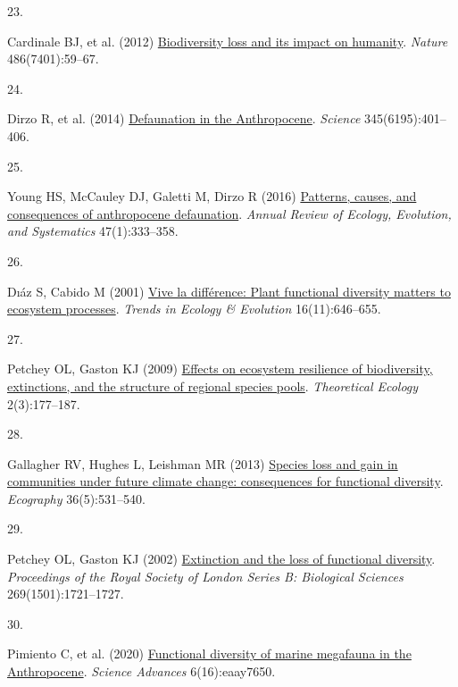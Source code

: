 \documentclass{article}
\newlength{\cslhangindent}
\newlength{\csllabelwidth}
\newlength{\cslentryspacingunit} %
\newenvironment{CSLReferences}[2] %
 {%
  \setlength{\parindent}{0pt}
  \ifodd #1
  \let\oldpar\par
  \def\par{\hangindent=\cslhangindent\oldpar}
  \fi
  \setlength{\parskip}{#2\cslentryspacingunit}
 }%
 {}
\newcommand{\CSLLeftMargin}[1]{\parbox[t]{\csllabelwidth}{#1}}
\newcommand{\CSLRightInline}[1]{\parbox[t]{\linewidth - \csllabelwidth}{#1}\break}
\begin{document}
\begin{CSLReferences}{0}{0}
\leavevmode{}%
\CSLLeftMargin{23. }%
\CSLRightInline{Cardinale BJ, et al. (2012)
\href{https://doi.org/10.1038/nature11148}{Biodiversity loss and its
impact on humanity}. \emph{Nature} 486(7401):59--67.}

\leavevmode{}%
\CSLLeftMargin{24. }%
\CSLRightInline{Dirzo R, et al. (2014)
\href{https://doi.org/10.1126/science.1251817}{Defaunation in the
Anthropocene}. \emph{Science} 345(6195):401--406.}

\leavevmode{}%
\CSLLeftMargin{25. }%
\CSLRightInline{Young HS, McCauley DJ, Galetti M, Dirzo R (2016)
\href{https://doi.org/10.1146/annurev-ecolsys-112414-054142}{Patterns,
causes, and consequences of anthropocene defaunation}. \emph{Annual
Review of Ecology, Evolution, and Systematics} 47(1):333--358.}

\leavevmode{}%
\CSLLeftMargin{26. }%
\CSLRightInline{Dıáz S, Cabido M (2001)
\href{https://doi.org/10.1016/S0169-5347(01)02283-2}{Vive la différence:
Plant functional diversity matters to ecosystem processes}. \emph{Trends
in Ecology \& Evolution} 16(11):646--655.}

\leavevmode{}%
\CSLLeftMargin{27. }%
\CSLRightInline{Petchey OL, Gaston KJ (2009)
\href{https://doi.org/10.1007/s12080-009-0041-9}{Effects on ecosystem
resilience of biodiversity, extinctions, and the structure of regional
species pools}. \emph{Theoretical Ecology} 2(3):177--187.}

\leavevmode{}%
\CSLLeftMargin{28. }%
\CSLRightInline{Gallagher RV, Hughes L, Leishman MR (2013)
\href{https://doi.org/10.1111/j.1600-0587.2012.07514.x}{Species loss and
gain in communities under future climate change: consequences for
functional diversity}. \emph{Ecography} 36(5):531--540.}

\leavevmode{}%
\CSLLeftMargin{29. }%
\CSLRightInline{Petchey OL, Gaston KJ (2002)
\href{https://doi.org/10.1098/rspb.2002.2073}{Extinction and the loss of
functional diversity}. \emph{Proceedings of the Royal Society of London
Series B: Biological Sciences} 269(1501):1721--1727.}

\leavevmode{}%
\CSLLeftMargin{30. }%
\CSLRightInline{Pimiento C, et al. (2020)
\href{https://doi.org/10.1126/sciadv.aay7650}{Functional diversity of
marine megafauna in the Anthropocene}. \emph{Science Advances}
6(16):eaay7650.}


\end{CSLReferences}
\end{document}
